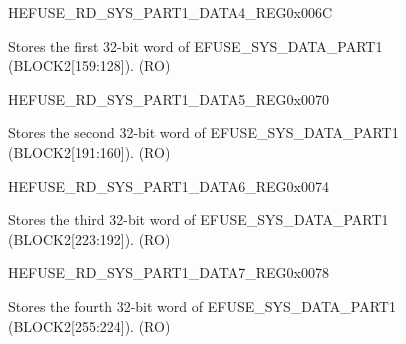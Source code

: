 \begin{register}{H}{EFUSE\_RD\_SYS\_PART1\_DATA4\_REG}{0x006C}\label{regdesc:EFUSERDSYSPART1DATA4REG}
%
\regnewline%
\begin{regdesc}\begin{reglist}
\label{fielddesc:EFUSESYSDATAPART14}\item [EFUSE\_SYS\_DATA\_PART1\_4] Stores the first 32-bit word of EFUSE\_SYS\_DATA\_PART1 (BLOCK2[159:128]). (RO)
\end{reglist}\end{regdesc}
\end{register}


\begin{register}{H}{EFUSE\_RD\_SYS\_PART1\_DATA5\_REG}{0x0070}\label{regdesc:EFUSERDSYSPART1DATA5REG}
%
\regnewline%
\begin{regdesc}\begin{reglist}
\label{fielddesc:EFUSESYSDATAPART15}\item [EFUSE\_SYS\_DATA\_PART1\_5] Stores the second 32-bit word of EFUSE\_SYS\_DATA\_PART1 (BLOCK2[191:160]). (RO)
\end{reglist}\end{regdesc}
\end{register}


\begin{register}{H}{EFUSE\_RD\_SYS\_PART1\_DATA6\_REG}{0x0074}\label{regdesc:EFUSERDSYSPART1DATA6REG}
%
\regnewline%
\begin{regdesc}\begin{reglist}
\label{fielddesc:EFUSESYSDATAPART16}\item [EFUSE\_SYS\_DATA\_PART1\_6] Stores the third 32-bit word of EFUSE\_SYS\_DATA\_PART1 (BLOCK2[223:192]). (RO)
\end{reglist}\end{regdesc}
\end{register}


\begin{register}{H}{EFUSE\_RD\_SYS\_PART1\_DATA7\_REG}{0x0078}\label{regdesc:EFUSERDSYSPART1DATA7REG}
%
\regnewline%
\begin{regdesc}\begin{reglist}
\label{fielddesc:EFUSESYSDATAPART17}\item [EFUSE\_SYS\_DATA\_PART1\_7] Stores the fourth 32-bit word of EFUSE\_SYS\_DATA\_PART1 (BLOCK2[255:224]). (RO)
\end{reglist}\end{regdesc}
\end{register}


